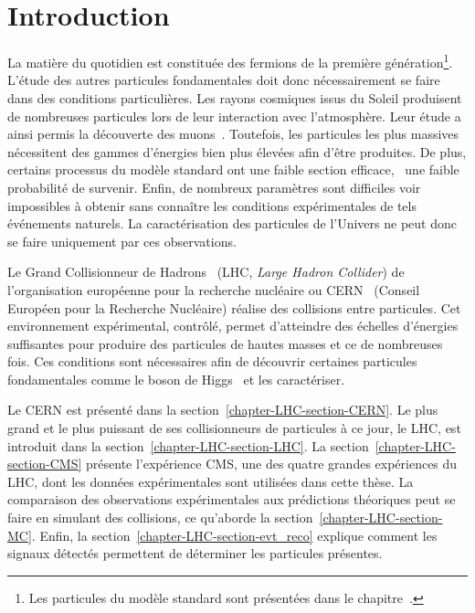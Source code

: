 \section{Introduction}\label{chapter-LHC-section-introduction}
La matière \og du quotidien \fg{} est constituée des fermions de la première génération\footnote{Les particules du modèle standard sont présentées dans le chapitre~.}.
L'étude des autres particules fondamentales doit donc nécessairement se faire dans des conditions particulières.
Les rayons cosmiques issus du Soleil produisent de nombreuses particules lors de leur interaction avec l'atmosphère.
Leur étude a ainsi permis la découverte des muons~\cite{muon_discovery}.
Toutefois, les particules les plus massives nécessitent des gammes d'énergies bien plus élevées afin d'être produites.
De plus, certains processus du modèle standard ont une faible section efficace, \ie\ une faible probabilité de survenir.
Enfin, de nombreux paramètres sont difficiles voir impossibles à obtenir sans connaître les conditions expérimentales de tels événements naturels.
La caractérisation des particules de l'Univers ne peut donc se faire uniquement par ces observations.
\par Le Grand Collisionneur de Hadrons~\cite{LHC_paper1,LHC_paper2,LHC_paper3} (LHC, \emph{Large Hadron Collider}) de l'organisation européenne pour la recherche nucléaire ou CERN~\cite{CERN_website} (Conseil Européen pour la Recherche Nucléaire) réalise des collisions entre particules.
Cet environnement expérimental, contrôlé, permet d'atteindre des échelles d'énergies suffisantes pour produire des particules de hautes masses et ce de nombreuses fois.
Ces conditions sont nécessaires afin de découvrir certaines particules fondamentales comme le boson de Higgs~\cite{ATLAS_Higgs_discovery,CMS_Higgs_discovery,CMS_Higgs_discovery_2013,ATLAS-CMS-Higgs_combined_1,ATLAS-CMS-Higgs_combined_2} et les caractériser.
\par Le CERN est présenté dans la section~\ref{chapter-LHC-section-CERN}.
Le plus grand et le plus puissant de ses collisionneurs de particules à ce jour, le LHC, est introduit dans la section~\ref{chapter-LHC-section-LHC}.
La section~\ref{chapter-LHC-section-CMS} présente l'expérience CMS, une des quatre grandes expériences du LHC, dont les données expérimentales sont utilisées dans cette thèse.
La comparaison des observations expérimentales aux prédictions théoriques peut se faire en simulant des collisions, ce qu'aborde la section~\ref{chapter-LHC-section-MC}.
Enfin, la section~\ref{chapter-LHC-section-evt_reco} explique comment les signaux détectés permettent de déterminer les particules présentes.